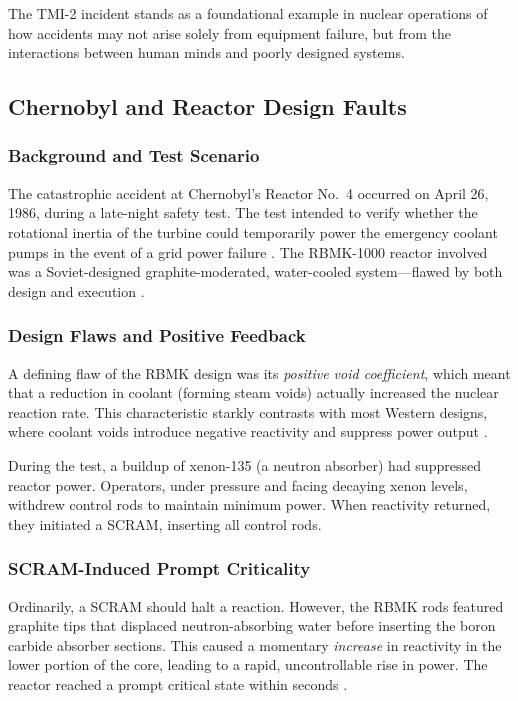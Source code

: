 \documentclass[12pt]{article}
\begin{document}
The TMI-2 incident stands as a foundational example in nuclear operations of how accidents may not arise solely from equipment failure, but from the interactions between human minds and poorly designed systems.

\subsection{Chernobyl and Reactor Design Faults}

\subsubsection{Background and Test Scenario}
The catastrophic accident at Chernobyl's Reactor No.~4 occurred on April 26, 1986, during a late-night safety test. The test intended to verify whether the rotational inertia of the turbine could temporarily power the emergency coolant pumps in the event of a grid power failure \autocite{wna2023chernobyl}. The RBMK-1000 reactor involved was a Soviet-designed graphite-moderated, water-cooled system—flawed by both design and execution \autocite{iaea1992chernobyl, nrc_chernobyl}.

\subsubsection{Design Flaws and Positive Feedback}
A defining flaw of the RBMK design was its \textit{positive void coefficient}, which meant that a reduction in coolant (forming steam voids) actually increased the nuclear reaction rate. This characteristic starkly contrasts with most Western designs, where coolant voids introduce negative reactivity and suppress power output \autocite{mitocw_rbmkreview}.

During the test, a buildup of xenon-135 (a neutron absorber) had suppressed reactor power. Operators, under pressure and facing decaying xenon levels, withdrew control rods to maintain minimum power. When reactivity returned, they initiated a SCRAM, inserting all control rods.

\subsubsection{SCRAM-Induced Prompt Criticality}
Ordinarily, a SCRAM should halt a reaction. However, the RBMK rods featured graphite tips that displaced neutron-absorbing water before inserting the boron carbide absorber sections. This caused a momentary \textit{increase} in reactivity in the lower portion of the core, leading to a rapid, uncontrollable rise in power. The reactor reached a prompt critical state within seconds \autocite{iaea1992chernobyl}.
\end{document}
